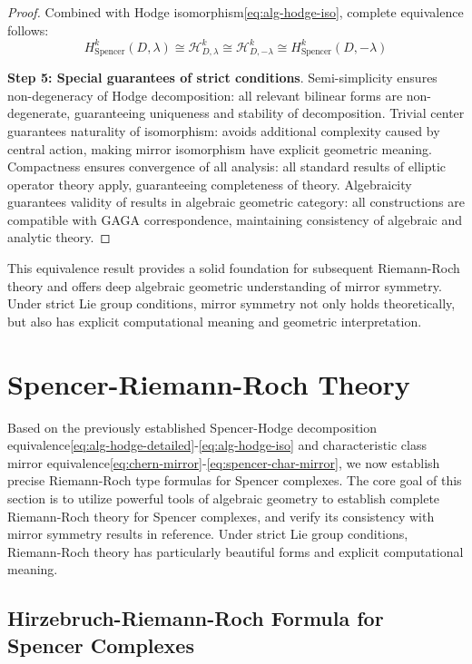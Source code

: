 \documentclass[a4paper,12pt]{extarticle}
\theoremstyle{definition}
\begin{document}
\begin{proof}
Combined with Hodge isomorphism\eqref{eq:alg-hodge-iso}, complete equivalence follows:
$$H^k_{\text{Spencer}}(D,\lambda) \cong \mathcal{H}^k_{D,\lambda} \cong \mathcal{H}^k_{D,-\lambda} \cong H^k_{\text{Spencer}}(D,-\lambda)$$

\textbf{Step 5: Special guarantees of strict conditions}. Semi-simplicity ensures non-degeneracy of Hodge decomposition: all relevant bilinear forms are non-degenerate, guaranteeing uniqueness and stability of decomposition. Trivial center guarantees naturality of isomorphism: avoids additional complexity caused by central action, making mirror isomorphism have explicit geometric meaning. Compactness ensures convergence of all analysis: all standard results of elliptic operator theory apply, guaranteeing completeness of theory. Algebraicity guarantees validity of results in algebraic geometric category: all constructions are compatible with GAGA correspondence, maintaining consistency of algebraic and analytic theory.
\end{proof}

This equivalence result provides a solid foundation for subsequent Riemann-Roch theory and offers deep algebraic geometric understanding of mirror symmetry. Under strict Lie group conditions, mirror symmetry not only holds theoretically, but also has explicit computational meaning and geometric interpretation.

\section{Spencer-Riemann-Roch Theory}

Based on the previously established Spencer-Hodge decomposition equivalence\eqref{eq:alg-hodge-detailed}-\eqref{eq:alg-hodge-iso} and characteristic class mirror equivalence\eqref{eq:chern-mirror}-\eqref{eq:spencer-char-mirror}, we now establish precise Riemann-Roch type formulas for Spencer complexes. The core goal of this section is to utilize powerful tools of algebraic geometry to establish complete Riemann-Roch theory for Spencer complexes, and verify its consistency with mirror symmetry results in reference\cite{zheng2025mirror}. Under strict Lie group conditions, Riemann-Roch theory has particularly beautiful forms and explicit computational meaning.

\subsection{Hirzebruch-Riemann-Roch Formula for Spencer Complexes}
\end{document}
